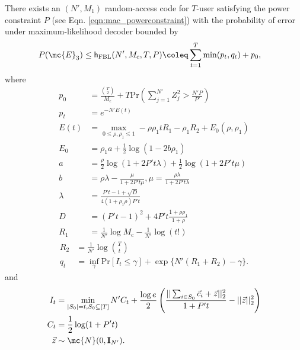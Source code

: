 \documentclass[final,onecolumn,12pt]{IEEEtran}
\def\Pr{\mathrm{Pr}}
\def\hFBL{\mathsf{h}_{\text{FBL}}}
\begin{document}
\begin{lemma}
There exists an $(N',M_1)$ random-access code for $T$-user satisfying the power constraint $P$ (see Eqn. \eqref{eqn:mac_powerconstraint}) with the probability of error under maximum-likelihood decoder bounded by
\begin{align}
P (\mc{E}_3)&\leq \hFBL(N',M_\mathrm{c},T,P)\coleq	\sum_{t=1}^{T} \min(p_t,q_t)+p_0,
\label{eqn:FBLbounds}
\end{align}
where
\begin{align*}
p_0 &=\frac{\binom{T}{2}}{M_\mathrm{c}}+T \Pr\left(\sum_{j=1}^{N'} Z_j^2>\frac{N'P}{P'}\right)\\
p_t&=e^{-N'E(t)}\\
E(t)&=\max_{0\leq \rho,\rho_1\leq 1}-\rho\rho_1tR_1-\rho_1R_2+E_0(\rho,\rho_1)\\
E_0&=\rho_1 a+\frac{1}{2}\log (1-2b\rho_1)\\
a&=\frac{\rho}{2}\log(1+2P't\lambda)+\frac{1}{2}\log(1+2P't\mu)\\
b&=\rho\lambda-\frac{\mu}{1+2P't\mu},\mu=\frac{\rho\lambda}{1+2P't\lambda}\\
\lambda&=\frac{P't-1+\sqrt{D}}{4(1+\rho_1\rho)P't}\\
D&=(P't-1)^2+4P't\frac{1+\rho\rho_1}{1+\rho}\\
R_1&=\frac{1}{N'}\log M_\mathrm{c}-\frac{1}{N'}\log(t!)
\end{align*}
\begin{align*}
R_2&=\frac{1}{N'}\log \binom{T}{t}\\
q_t&=\inf_\gamma \Pr[I_t\leq \gamma]+\exp\{N'(R_1+R_2)-\gamma\}.
\end{align*}
and
\begin{align*}
I_t&=\min_{|S_0|=t,S_0\subseteq [T]}N'C_t+\frac{\log e}{2}\left(\frac{||\sum_{i\in S_0} \vec{c}_i+\vec{z}||_2^2}{1+P't}-||\vec{z}||_2^2\right)\\
C_t &=\frac{1}{2}\log (1+P't)\\
\vec{z}&\sim \mc{N}(0,\mathbf{I}_{N'}).
\end{align*}
\end{lemma}
\end{document}

